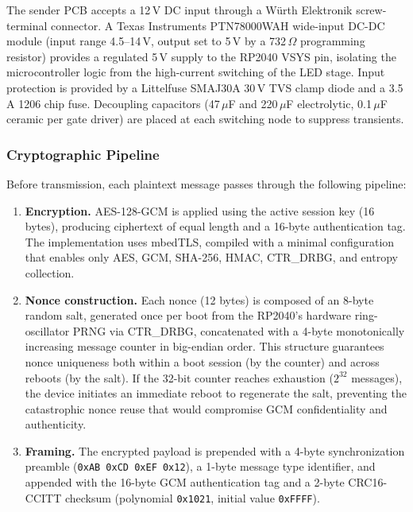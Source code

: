 \documentclass[conference]{IEEEtran}
\begin{document}
The sender PCB accepts a 12\,V DC input through a Würth Elektronik screw-terminal connector. A Texas Instruments PTN78000WAH wide-input DC-DC module (input range 4.5--14\,V, output set to 5\,V by a 732\,$\Omega$ programming resistor) provides a regulated 5\,V supply to the RP2040 VSYS pin, isolating the microcontroller logic from the high-current switching of the LED stage. Input protection is provided by a Littelfuse SMAJ30A 30\,V TVS clamp diode and a 3.5\,A 1206 chip fuse. Decoupling capacitors (47\,$\mu$F and 220\,$\mu$F electrolytic, 0.1\,$\mu$F ceramic per gate driver) are placed at each switching node to suppress transients.

\subsubsection{Cryptographic Pipeline}

Before transmission, each plaintext message passes through the following pipeline:

\begin{enumerate}
\item \textbf{Encryption.} AES-128-GCM is applied using the active session key (16 bytes), producing ciphertext of equal length and a 16-byte authentication tag. The implementation uses mbedTLS, compiled with a minimal configuration that enables only AES, GCM, SHA-256, HMAC, CTR\_DRBG, and entropy collection.

\item \textbf{Nonce construction.} Each nonce (12 bytes) is composed of an 8-byte random salt, generated once per boot from the RP2040's hardware ring-oscillator PRNG via CTR\_DRBG, concatenated with a 4-byte monotonically increasing message counter in big-endian order. This structure guarantees nonce uniqueness both within a boot session (by the counter) and across reboots (by the salt). If the 32-bit counter reaches exhaustion ($2^{32}$ messages), the device initiates an immediate reboot to regenerate the salt, preventing the catastrophic nonce reuse that would compromise GCM confidentiality and authenticity.

\item \textbf{Framing.} The encrypted payload is prepended with a 4-byte synchronization preamble (\texttt{0xAB\,0xCD\,0xEF\,0x12}), a 1-byte message type identifier, and appended with the 16-byte GCM authentication tag and a 2-byte CRC16-CCITT checksum (polynomial \texttt{0x1021}, initial value \texttt{0xFFFF}).
\end{enumerate}
\end{document}
